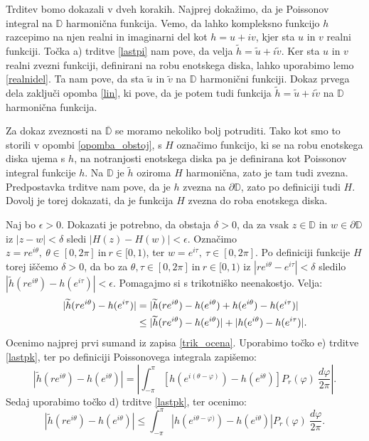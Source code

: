 \documentclass[mat1]{fmfdelo}
\begin{document}
     \begin{dokaz}
        Trditev bomo dokazali v dveh korakih. Najprej dokažimo, da je Poissonov integral na $\mathbb{D}$ harmonična funkcija.
        Vemo, da lahko kompleksno funkcijo $h$ razcepimo na njen realni in imaginarni del kot $h = u + iv$, kjer sta $u$ in $v$ realni funkciji. 
        Točka a) trditve \ref{lastpi} nam pove, da velja $\widetilde{h} = \widetilde{u} + i \widetilde{v}$.
        Ker sta $u$ in $v$ realni zvezni funkciji, definirani na robu enotskega diska, lahko uporabimo lemo \ref{realnidel}. Ta nam pove, da sta $\widetilde{u}$ in $\widetilde{v}$ na $\mathbb{D}$ harmonični funkciji. 
        Dokaz prvega dela zaključi opomba \ref{lin}, ki pove, da je potem tudi funkcija $\widetilde{h} = \widetilde{u} + i \widetilde{v}$ na $\mathbb{D}$ harmonična funkcija.
        
        Za dokaz zveznosti na $\overline{\mathbb{D}}$ se moramo nekoliko bolj potruditi. Tako kot smo to storili v opombi \ref{opomba_obstoj}, s $H$ označimo funkcijo, ki se na robu enotskega diska ujema s $h$, na notranjosti enotskega diska pa je definirana kot Poissonov integral funkcije $h$. 
        Na  $\mathbb{D}$ je $\widetilde{h}$ oziroma $H$ harmonična, zato je tam tudi zvezna. Predpostavka trditve nam pove, da je $h$ zvezna na $\partial \mathbb{D}$, zato po definiciji tudi $H$. 
        Dovolj je torej dokazati, da je funkcija $H$ zvezna do roba enotskega diska.
        
        Naj bo $\epsilon >0$. Dokazati je potrebno, da obstaja $\delta >0$, da za vsak $z \in \mathbb{D}$ in $w \in \partial \mathbb{D}$ iz $|z - w| < \delta$ sledi $|H(z) - H(w)| < \epsilon$. 
        Označimo $z = r e^{i \theta},~\theta \in [0,2\pi]~\text{in}~r \in [0,1)$, ter $w = e^{i \tau},~\tau \in [0,2\pi]$.
        Po definiciji funkcije $H$ torej iščemo $\delta >0$, da bo za $\theta, \tau \in [0,2\pi]~\text{in}~r \in [0,1)$ iz $|r e^{i \theta} - e^{i\tau}| < \delta$ sledilo $|\widetilde{h}(r e^{i \theta}) - h(e^{i\tau})| < \epsilon$.
        Pomagajmo si s trikotniško neenakostjo. Velja:
        \begin{align}
            \label{trik_ocena}
            |\widetilde{h}(r e^{i \theta}) - h(e^{i\tau})| &= |\widetilde{h}(r e^{i \theta}) - h(e^{i \theta}) + h(e^{i \theta}) - h(e^{i\tau})| \notag \\
            &\leq |\widetilde{h}(r e^{i \theta}) - h(e^{i\theta})| + |h(e^{i\theta}) - h(e^{i\tau})|.
        \end{align}
        Ocenimo najprej prvi sumand iz zapisa \eqref{trik_ocena}. Uporabimo točko e) trditve \ref{lastpk}, ter po definiciji Poissonovega integrala zapišemo: 
        $$
            \left|\widetilde{h}(r e^{i \theta}) - h(e^{i\theta})\right| = \left|\int_{-\pi}^{\pi}{\left[h\left(e^{i(\theta - \varphi)}\right) - h\left(e^{i\theta}\right)\right]P_r(\varphi)~\frac{d\varphi}{2 \pi}}\right|.
        $$
        Sedaj uporabimo točko d) trditve \ref{lastpk}, ter ocenimo:
        $$
        \left|\widetilde{h}(r e^{i \theta}) - h(e^{i\theta})\right| \leq \int_{-\pi}^{\pi}{\left| h\left(e^{i\theta - \varphi)}\right) - h \left(e^{i\theta}\right) \right|P_r(\varphi)~\frac{d\varphi}{2 \pi}}.
        $$ 


\end{dokaz}
\end{document}
